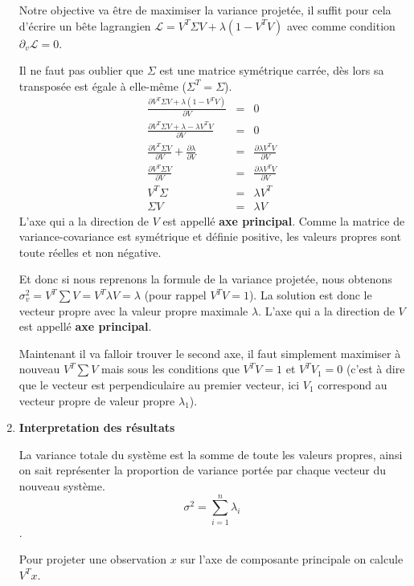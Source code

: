 \documentclass[a4paper, 11pt, onecolumn]{article}
\begin{document}
\begin{enumerate}
Notre objective va être de maximiser la variance projetée, il suffit pour cela d'écrire un bête lagrangien $\mathcal{L} = V^T\Sigma V + \lambda (1-V^TV)$ avec comme condition $\partial_v \mathcal{L} = 0$.

\begin{framed}
Il ne faut pas oublier que $\Sigma$ est une matrice symétrique carrée, dès lors sa transposée est égale à elle-même ($\Sigma^T = \Sigma$).
\begin{eqnarray}
\frac{\partial V^T\Sigma V + \lambda (1-V^TV)}{\partial V} &=& 0\\
\frac{\partial V^T\Sigma V + \lambda - \lambda V^TV}{\partial V} &=& 0\\
\frac{\partial V^T\Sigma V}{\partial V} + \frac{\partial \lambda}{\partial V} &=& \frac{\partial\lambda V^TV}{\partial V}\\
\frac{\partial V^T\Sigma V}{\partial V} &=& \frac{\partial\lambda V^TV}{\partial V}\\
V^T\Sigma &=& \lambda V^T\\
\Sigma V &=& \lambda V
\end{eqnarray}
L'axe qui a la direction de $V$ est appellé \textbf{axe principal}. Comme la matrice de variance-covariance est symétrique et définie positive, les valeurs propres sont toute réelles et non négative.
\end{framed}

Et donc si nous reprenons la formule de la variance projetée, nous obtenons $\sigma_v^2 = V^T\sum V = V^T \lambda V = \lambda$ (pour rappel $V^TV = 1$). La solution est donc le vecteur propre avec la valeur propre maximale $\lambda$. L'axe qui a la direction de $V$ est appellé \textbf{axe principal}. 

Maintenant il va falloir trouver le second axe, il faut simplement maximiser à nouveau $V^T \sum V$ mais sous les conditions que $V^TV = 1$ et $V^TV_1 = 0$ (c'est à dire que le vecteur est perpendiculaire au premier vecteur, ici $V_1$ correspond au vecteur propre de valeur propre $\lambda_1$).

\item \textbf{Interpretation des résultats}

La variance totale du système est la somme de toute les valeurs propres, ainsi on sait représenter la proportion de variance portée par chaque vecteur du nouveau système.
$$\sigma^2 = \sum_{i=1}^n \lambda_i$$.

Pour projeter une observation $x$ sur l'axe de composante principale on calcule $V^T x$.


\end{enumerate}
\end{document}
